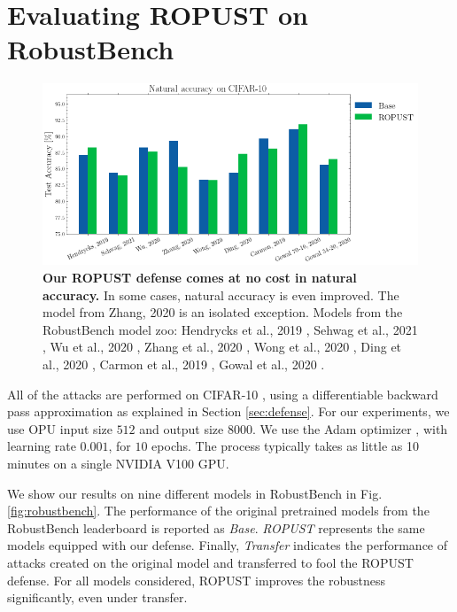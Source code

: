 \documentclass{article}
\begin{document}
\section{Evaluating ROPUST on RobustBench}\label{sec:robustbench}
\begin{figure}
    \centering
    \includegraphics[width=\textwidth]{natural_accuracy.png}
    \caption{\textbf{Our ROPUST defense comes at no cost in natural accuracy.} In some cases, natural accuracy is even improved. The model from Zhang, 2020 \cite{Zhang2020GeometryawareIA} is an isolated exception. Models from the RobustBench model zoo: Hendrycks et al., 2019 \cite{Hendrycks2019UsingPC}, Sehwag et al., 2021 \cite{Sehwag2021ImprovingAR}, Wu et al., 2020 \cite{Wu2020AdversarialWP}, Zhang et al., 2020 \cite{Zhang2020GeometryawareIA}, Wong et al., 2020 \cite{Wong2020FastIB}, Ding et al., 2020 \cite{Ding2020MaxMarginA}, Carmon et al., 2019 \cite{Carmon2019UnlabeledDI}, Gowal et al., 2020 \cite{Gowal2020UncoveringTL}.}
    \label{fig:natacc}
\end{figure}
All of the attacks are performed on CIFAR-10 \cite{Krizhevsky2009LearningML}, using a differentiable backward pass approximation \cite{athalye2018obfuscated} as explained in Section \ref{sec:defense}. For our experiments, we use OPU input size $512$ and output size $8000$. We use the Adam optimizer \cite{kingma2014adam}, with learning rate $0.001$, for $10$ epochs. The process typically takes as little as 10 minutes on a single NVIDIA V100 GPU. 

We show our results on nine different models in RobustBench in Fig. \ref{fig:robustbench}. The performance of the original pretrained models from the RobustBench leaderboard is reported as \textit{Base}. \textit{ROPUST} represents the same models equipped with our defense. Finally, \textit{Transfer} indicates the performance of attacks created on the original model and transferred to fool the ROPUST defense. For all models considered, ROPUST improves the robustness significantly, even under transfer. 
\end{document}
